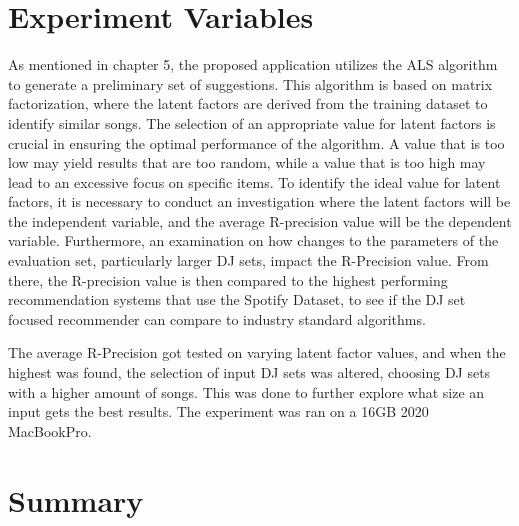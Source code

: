 \section{Experiment Variables}

As mentioned in chapter 5, the proposed application utilizes the ALS algorithm to generate a preliminary set of suggestions. This algorithm is based on matrix factorization, where the latent factors are derived from the training dataset to identify similar songs. The selection of an appropriate value for latent factors is crucial in ensuring the optimal performance of the algorithm. A value that is too low may yield results that are too random, while a value that is too high may lead to an excessive focus on specific items. To identify the ideal value for latent factors, it is necessary to conduct an  investigation where the latent factors will be the independent variable, and the average R-precision value will be the dependent variable. Furthermore, an examination on how changes to the parameters of the evaluation set, particularly larger DJ sets, impact the R-Precision value. From there, the R-precision value  is then compared to the highest performing recommendation systems that use the Spotify Dataset, to see if the DJ set focused recommender can compare to industry standard algorithms.

The average R-Precision got tested on varying latent factor values, and when the highest was found, the selection of input DJ sets was altered, choosing DJ sets with a higher amount of songs. This was done to further explore what size an input gets the best results. The experiment was ran on a 16GB 2020 MacBookPro.

\section{Summary}

